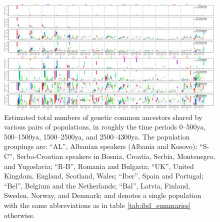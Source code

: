\documentclass{article}
\begin{document}
\begin{figure}[!htp]
  \begin{center}
    
    \vspace{2em}
    \begin{center}
      \includegraphics{inversion-boxplots-long}
    \end{center}
    \vspace{2em}
    \caption{
    Estimated total numbers of genetic common ancestors shared by various pairs of populations,
    in roughly the time periods 0--500ya, 500--1500ya, 1500--2500ya, and 2500--4300ya.
    The population groupings are:
    ``AL'', Albanian speakers (Albania and Kosovo);
    ``S-C'', Serbo-Croatian speakers in Bosnia, Croatia, Serbia, Montenegro, and Yugoslavia;
    ``R-B'', Romania and Bulgaria;
    ``UK'', United Kingdom, England, Scotland, Wales;
    ``Iber'', Spain and Portugal;
    ``Bel'', Belgium and the Netherlands;
    ``Bal'', Latvia, Finland, Sweden, Norway, and Denmark;
    and denotes a single population with the same abbreviations as in table \ref{tab:ibd_summaries} otherwise.
    \label{sfig:inversion_boxplots_long}
    }
  \end{center}
\end{figure}
\end{document}
